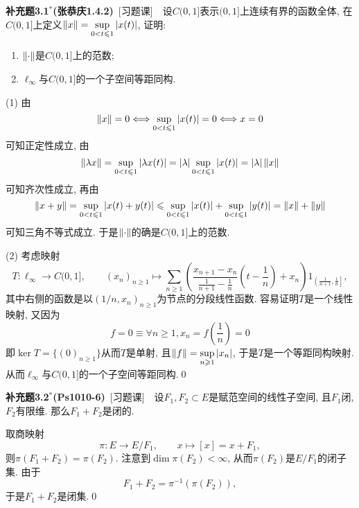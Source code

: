 	\textbf{补充题3.1$ ^* $(张恭庆1.4.2)}\ [习题课]\ \ 设$ C(0,1] $表示$ (0,1] $上连续有界的函数全体, 在$ C(0,1] $上定义$ \left\| x \right\|=\sup\limits_{0<t\leqslant 1}\left| x(t) \right|  $, 证明:
	\begin{enumerate}[(1)]
	\item $ \left\| \cdot \right\| $是$ C(0,1] $上的范数;
	\item $ \ell_\infty $与$ C(0,1] $的一个子空间等距同构.
	\end{enumerate}
	
	\begin{Proof}
	(1) 由
	\[
	\left\| x \right\|=0\Longleftrightarrow\sup_{0<t\leqslant 1}\left| x(t) \right| =0\Longleftrightarrow x=0
	\]
	可知正定性成立, 由
	\[
	\left\| \lambda x \right\|=\sup_{0<t\leqslant 1}\left| \lambda x(t) \right| =\left| \lambda \right| \sup_{0<t\leqslant 1}\left| x(t) \right| =\left| \lambda \right| \left\| x \right\|
	\]
	可知齐次性成立, 再由
	\[
	\left\| x+y \right\|=\sup_{0<t\leqslant 1}\left| x(t)+y(t) \right| \leqslant\sup_{0<t\leqslant 1}\left| x(t) \right| +\sup_{0<t\leqslant 1}\left| y(t) \right| =\left\| x \right\|+\left\| y \right\|
	\]
	可知三角不等式成立. 于是$ \left\| \cdot \right\| $的确是$ C(0,1] $上的范数.
	
	(2) 考虑映射
	\[
	T : \ell_\infty\to C(0,1],\qquad (x_n)_{n\geqslant 1}\mapsto\sum_{n\geqslant 1}\left(\frac{x_{n+1}-x_n}{\frac{1}{n+1}-\frac{1}{n}}\left(t-\frac{1}{n}\right)+x_n\right)1_{\left( \frac{1}{n+1},\frac{1}{n} \right]},
	\]
	其中右侧的函数是以$ (1/n,x_n)_{n\geqslant 1} $为节点的分段线性函数. 容易证明$ T $是一个线性映射, 又因为
	\[
	f=0\equiv \forall n\geqslant 1, x_n=f\left(\frac{1}{n}\right)=0
	\]
	即$ \ker T=\{ (0)_{n\geqslant 1} \} $从而$ T $是单射, 且$ \left\| f \right\|=\sup\limits_{n\geqslant 1}\left| x_n \right|  $, 于是$ T $是一个等距同构映射. 从而$ \ell_\infty $与$ C(0,1] $的一个子空间等距同构.\qed
	\end{Proof}

	\textbf{补充题3.2$ ^* $(Ps1010-6)}\ [习题课]\ \ 设$ F_1,F_2\subset E $是赋范空间的线性子空间, 且$ F_1 $闭, $ F_2 $有限维. 那么$ F_1+F_2 $是闭的.
	\begin{Proof}
	取商映射
	\[
	\pi : E\to E/F_1,\qquad x\mapsto [x]=x+F_1,
	\]
	则$ \pi(F_1+F_2)=\pi(F_2) $. 注意到$ \dim\pi(F_2)<\infty $, 从而$ \pi(F_2) $是$ E/F_1 $的闭子集. 由于
	\[
	F_1+F_2=\pi^{-1}(\pi(F_2)),
	\]
	于是$ F_1+F_2 $是闭集.\qed
	\end{Proof}
	
